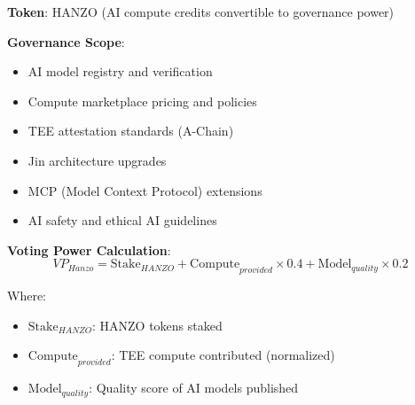 \textbf{Token}: HANZO (AI compute credits convertible to governance power)

\textbf{Governance Scope}:
\begin{itemize}
\item AI model registry and verification
\item Compute marketplace pricing and policies
\item TEE attestation standards (A-Chain)
\item Jin architecture upgrades
\item MCP (Model Context Protocol) extensions
\item AI safety and ethical AI guidelines
\end{itemize}

\textbf{Voting Power Calculation}:
\begin{equation}
VP_{Hanzo} = \text{Stake}_{HANZO} + \text{Compute}_{provided} \times 0.4 + \text{Model}_{quality} \times 0.2
\end{equation}

Where:
\begin{itemize}
\item $\text{Stake}_{HANZO}$: HANZO tokens staked
\item $\text{Compute}_{provided}$: TEE compute contributed (normalized)
\item $\text{Model}_{quality}$: Quality score of AI models published
\end{itemize}

